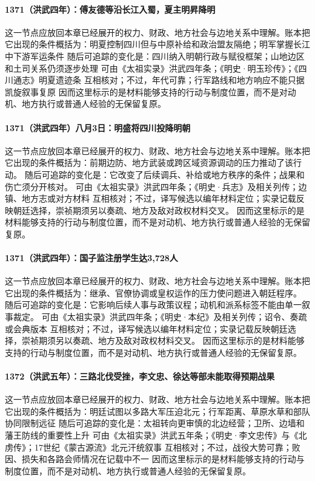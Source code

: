 \paragraph{1371（洪武四年）：傅友德等沿长江入蜀，夏主明昇降明} 这一节点应放回本章已经展开的权力、财政、地方社会与边地关系中理解。账本把它出现的条件概括为：明夏控制四川但与中原补给和政治盟友隔绝；明军掌握长江中下游军运条件 随后可追踪的变化是：四川纳入明朝行政与赋役框架；山地边区和土司关系仍须逐步处理 可由《太祖实录》洪武四年条；《明史·明玉珍传》；《四川通志》明夏遗迹条 互相核对；不过，年代可靠；行军路线和地方响应不能只据凯旋叙事复原 因而这里标示的是材料能够支持的行动与制度位置，而不是对动机、地方执行或普通人经验的无保留复原。

\paragraph{1371（洪武四年）八月3日：明盛将四川投降明朝} 这一节点应放回本章已经展开的权力、财政、地方社会与边地关系中理解。账本把它出现的条件概括为：前期边防、地方武装或跨区域资源调动的压力推动了该行动。 随后可追踪的变化是：它改变了后续调兵、补给或地方秩序的条件；战果和伤亡须分开核对。 可由《太祖实录》洪武四年条；《明史·兵志》及相关列传；边镇、地方志或对方材料 互相核对；不过，译写候选以编年材料定位；实录记载反映朝廷选择，崇祯期须另以奏疏、地方及敌对政权材料交叉。 因而这里标示的是材料能够支持的行动与制度位置，而不是对动机、地方执行或普通人经验的无保留复原。

\paragraph{1371（洪武四年）：国子监注册学生达3,728人} 这一节点应放回本章已经展开的权力、财政、地方社会与边地关系中理解。账本把它出现的条件概括为：继承、官僚协调或皇权运作的压力使问题进入朝廷程序。 随后可追踪的变化是：它影响后续人事与政策议程；动机和派系标签不能由单一叙事裁定。 可由《太祖实录》洪武四年条；《明史·本纪》及相关列传；诏令、奏疏或会典版本 互相核对；不过，译写候选以编年材料定位；实录记载反映朝廷选择，崇祯期须另以奏疏、地方及敌对政权材料交叉。 因而这里标示的是材料能够支持的行动与制度位置，而不是对动机、地方执行或普通人经验的无保留复原。

\paragraph{1372（洪武五年）：三路北伐受挫，李文忠、徐达等部未能取得预期战果} 这一节点应放回本章已经展开的权力、财政、地方社会与边地关系中理解。账本把它出现的条件概括为：明廷试图以多路大军压迫北元；行军距离、草原水草和部队协同限制远征 随后可追踪的变化是：太祖转向更审慎的北边经营；卫所、边墙和藩王防线的重要性上升 可由《太祖实录》洪武五年条；《明史·李文忠传》与《北虏传》；17世纪《蒙古源流》北元汗统叙事 互相核对；不过，战役大势可靠；败因、损失和各路会师情况在记载中不一 因而这里标示的是材料能够支持的行动与制度位置，而不是对动机、地方执行或普通人经验的无保留复原。

